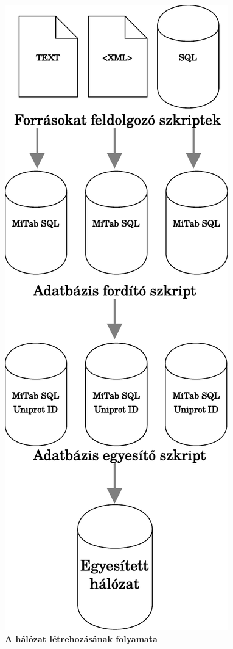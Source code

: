 \documentclass[a4paper,12pt]{article}
\begin{document}
			 	 \begin{figure}[H]
			 		 \includegraphics[scale=0.7]{img/Signalink_Layer0.pdf}
			 		 \centering

			 		 \caption{ \textbf{A hálózat létrehozásának folyamata} }
 

\end{figure}
\end{document}
